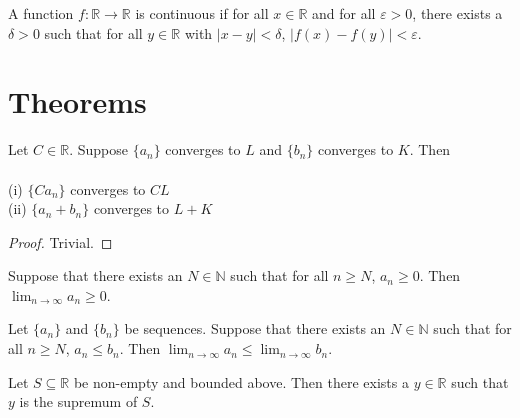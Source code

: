 \begin{definition}[continuous]
  \label{def:continuous}
  \leanok
  A function $f : \mathbb{R} → \mathbb{R}$ is continuous if for all $x \in \mathbb{R}$ and for all $\varepsilon > 0$, there exists a $\delta > 0$ such that for all $y ∈ \mathbb{R}$ with $|x - y| < \delta$, $|f(x) - f(y)| < \varepsilon$.
\end{definition}


\section{Theorems}


\begin{theorem}
  \label{thm:limit_laws}
  \leanok

  Let $C \in \mathbb{R}$. Suppose $\{a_n\}$ converges to $L$ and $\{b_n\}$ converges to $K$. Then \\ \\
  (i) $\{C a_n\}$ converges to $C L$ \\
  (ii) $\{a_n + b_n\}$ converges to $L + K$ 

\end{theorem}

\begin{proof}
  \leanok
  Trivial.
\end{proof}


\begin{lemma}
\label{lem:converges_nonneg}
  \leanok

  Suppose that there exists an $N \in ℕ$ such that for all $n \ge N$, $a_n ≥ 0$.
  Then $\lim_{n \to \infty} a_n ≥ 0$.

\end{lemma}

\begin{theorem}
  \label{thm:order_limit}
  \leanok

  Let $\{a_n\}$ and $\{b_n\}$ be sequences. 
  Suppose that there exists an $N ∈ ℕ$ such that for all $n ≥ N$, $a_n ≤ b_n$.
  Then $\lim_{n \to \infty} a_n \le \lim_{n \to \infty} b_n$.
\end{theorem}

\begin{theorem}
  \label{exists_sup_of_bounded_above}
  \leanok
  Let $S \subseteq \mathbb{R}$ be non-empty and bounded above.
  Then there exists a $y \in \mathbb{R}$ such that $y$ is the supremum of $S$.

\end{theorem}

